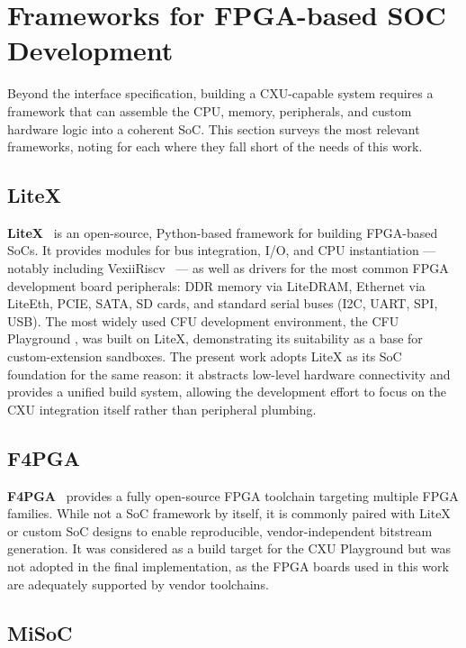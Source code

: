 \section{Frameworks for FPGA-based SOC Development}
\label{sec:related_fpga_frameworks}

Beyond the interface specification, building a CXU-capable system requires a framework
that can assemble the CPU, memory, peripherals, and custom hardware logic into a coherent
SoC.
This section surveys the most relevant frameworks, noting for each where they fall short
of the needs of this work.

\subsection{LiteX}
\label{subsec:litex}

\textbf{LiteX}~\cite{LiteXGitHub} is an open-source, Python-based framework for
building FPGA-based SoCs.
It provides modules for bus integration, I/O, and CPU instantiation --- notably including
VexiiRiscv~\cite{VexiiRiscVGithub} --- as well as drivers for the most common FPGA
development board peripherals: DDR memory via LiteDRAM, Ethernet via LiteEth, PCIE,
SATA, SD cards, and standard serial buses (I2C, UART, SPI, USB).
The most widely used CFU development environment, the CFU Playground
\cite{CFUPlayground2022}, was built on LiteX, demonstrating its suitability as a base
for custom-extension sandboxes.
The present work adopts LiteX as its SoC foundation for the same reason: it abstracts
low-level hardware connectivity and provides a unified build system, allowing the
development effort to focus on the CXU integration itself rather than peripheral plumbing.

\subsection{F4PGA}
\label{subsec:f4pga}

\textbf{F4PGA}~\cite{F4PGA2019} provides a fully open-source FPGA toolchain targeting
multiple FPGA families.
While not a SoC framework by itself, it is commonly paired with LiteX or custom SoC
designs to enable reproducible, vendor-independent bitstream generation.
It was considered as a build target for the CXU Playground but was not adopted in the
final implementation, as the FPGA boards used in this work are adequately supported by
vendor toolchains.

\subsection{MiSoC}
\label{subsec:misoc}

